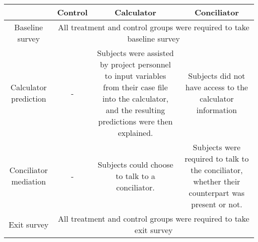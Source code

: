 \begin{tabular}{cccc}
\toprule
      & Control & Calculator & Conciliator \\
\midrule
Baseline survey & \multicolumn{3}{c}{All treatment and control groups were required to take baseline survey} \\
Calculator prediction & -     & Subjects were assisted by project personnel to input variables from their case file into the calculator, and the resulting predictions were then explained. & Subjects did not have access to the calculator information \\
Conciliator mediation & -     & Subjects could choose to talk to a conciliator.    & Subjects were required to talk to the conciliator, whether their counterpart was present or not. \\
Exit survey & \multicolumn{3}{c}{All treatment and control groups were required to take exit survey} \\
\bottomrule
\end{tabular}%
